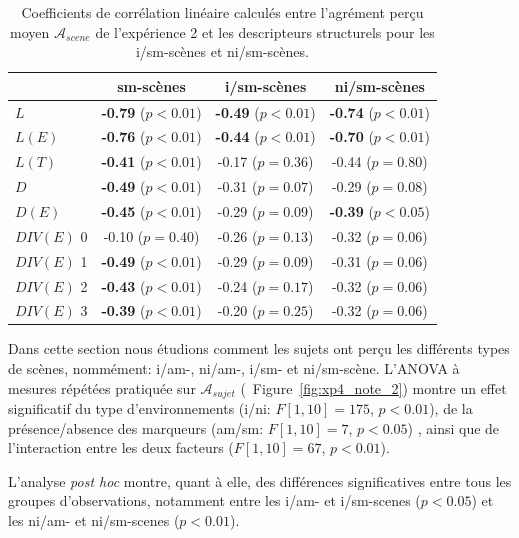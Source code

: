 \begin{table}[t]
\centering
\begin{tabular}{l c c c} 
               & sm-scènes                    & i/sm-scènes                & ni/sm-scènes    \\
\hline
$L$            & \textbf{-0.79} ($p<0.01$)    & \textbf{-0.49} ($p<0.01$)  & \textbf{-0.74} ($p<0.01$)\\
$L(E)$         & \textbf{-0.76} ($p<0.01$)    & \textbf{-0.44} ($p<0.01$)  & \textbf{-0.70} ($p<0.01$)\\
$L(T)$         & \textbf{-0.41} ($p<0.01$)    & -0.17 ($p=0.36$)           & -0.44 ($p=0.80$) \\
$D$            & \textbf{-0.49} ($p<0.01$)    & -0.31 ($p=0.07$)           & -0.29 ($p=0.08$)\\
$D(E)$         & \textbf{-0.45} ($p<0.01$)    & -0.29 ($p=0.09$)           & \textbf{-0.39} ($p<0.05$)\\
$DIV(E)$ 0     &         -0.10  ($p=0.40$)    & -0.26 ($p=0.13$)           & -0.32 ($p=0.06$)\\
$DIV(E)$ 1     & \textbf{-0.49} ($p<0.01$)    & -0.29 ($p=0.09$)           & -0.31 ($p=0.06$)\\
$DIV(E)$ 2     & \textbf{-0.43} ($p<0.01$)    & -0.24 ($p=0.17$)           & -0.32 ($p=0.06$)\\
$DIV(E)$ 3     & \textbf{-0.39} ($p<0.01$)    & -0.20 ($p=0.25$)           & -0.32 ($p=0.06$)\\
\hline
\end{tabular}
\vspace{0.5mm}
\caption{Coefficients de corrélation linéaire calculés entre l'agrément perçu moyen $\mathcal{A}_{scene}$ de l'expérience 2 et les descripteurs structurels pour les i/sm-scènes et ni/sm-scènes.}
\label{tab:corrSmXP4}
\end{table}

Dans cette section nous étudions comment les sujets ont perçu les différents types de scènes, nommément: i/am-, ni/am-, i/sm- et ni/sm-scène. L'ANOVA à mesures répétées pratiquée sur $\mathcal{A}_{sujet}$ (\cf~Figure~\ref{fig:xp4_note_2}) montre un effet significatif du type d'environnements (i/ni: $F[1,10]=175$, $p<0.01$), de la présence/absence des marqueurs (am/sm: $F[1,10]=7$, $p<0.05$) , ainsi que de l'interaction entre les deux facteurs ($F[1,10]=67$, $p<0.01$).

L'analyse \emph{post hoc} montre, quant à elle, des différences significatives entre tous les groupes d'observations, notamment entre les i/am- et i/sm-scenes ($p<0.05$) et les ni/am- et ni/sm-scenes ($p<0.01$).


